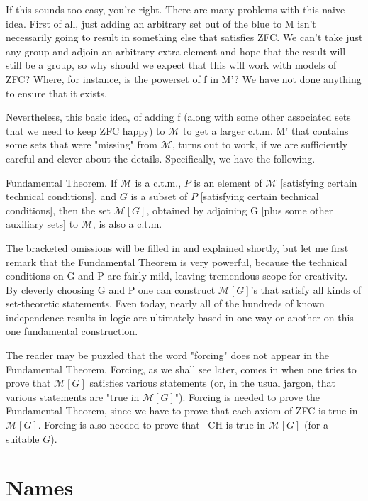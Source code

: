 \documentclass[10pt]{article}
\theoremstyle{definition}
\begin{document}
If this sounds too easy, you're right.  There are many problems with this
naive idea.  First of all, just adding an arbitrary set out of the blue to M
isn't necessarily going to result in something else that satisfies ZFC.  We
can't take just any group and adjoin an arbitrary extra element and hope
that the result will still be a group, so why should we expect that this
will work with models of ZFC?  Where, for instance, is the powerset of f in
M'?  We have not done anything to ensure that it exists.

Nevertheless, this basic idea, of adding f (along with some other associated
sets that we need to keep ZFC happy) to $\mathcal{M}$ to get a larger c.t.m. M' that
contains some sets that were "missing" from $\mathcal M$, turns out to work, if we are
sufficiently careful and clever about the details.  Specifically, we have
the following.

Fundamental Theorem.  If $\mathcal{M}$ is a c.t.m., $P$ is an element of $\mathcal{M}$ [satisfying
certain technical conditions], and $G$ is a subset of $P$ [satisfying certain
technical conditions], then the set $\mathcal{M}[G]$, obtained by adjoining G [plus some
other auxiliary sets] to $\mathcal M$, is also a c.t.m.

The bracketed omissions will be filled in and explained shortly, but let me
first remark that the Fundamental Theorem is very powerful, because the
technical conditions on G and P are fairly mild, leaving tremendous scope
for creativity.  By cleverly choosing G and P one can construct $\mathcal{M}[G]$'s that
satisfy all kinds of set-theoretic statements.  Even today, nearly all of
the hundreds of known independence results in logic are ultimately based in
one way or another on this one fundamental construction.

The reader may be puzzled that the word "forcing" does not appear in the
Fundamental Theorem.  Forcing, as we shall see later, comes in when one
tries to prove that $\mathcal{M}[G]$ satisfies various statements (or, in the usual
jargon, that various statements are "true in $\mathcal{M}[G]$").  Forcing is needed to
prove the Fundamental Theorem, since we have to prove that each axiom of ZFC
is true in $\mathcal{M}[G]$.  Forcing is also needed to prove that ~CH is true in $\mathcal{M}[G]$
(for a suitable $G$).


\section{Names}
\end{document}
